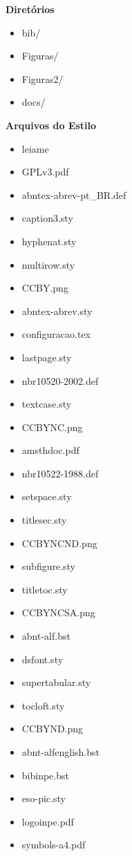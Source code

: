 \begin{multicols}{3}
    \textbf{Diretórios}
    \begin{itemize}
        \item bib/
        \item Figuras/
        \item Figuras2/
        \item docs/
    \end{itemize}
    \textbf{Arquivos do Estilo}
    \begin{itemize}
        \item leiame
        \item GPLv3.pdf
        \item abntex-abrev-pt\_BR.def
        \item caption3.sty
        \item hyphenat.sty
        \item multirow.sty
        \item CCBY.png
        \item abntex-abrev.sty
        \item configuracao.tex
        \item lastpage.sty
        \item nbr10520-2002.def
        \item textcase.sty
        \item CCBYNC.png
        \item amsthdoc.pdf
        \item nbr10522-1988.def
        \item setspace.sty
        \item titlesec.sty
        \item CCBYNCND.png
        \item subfigure.sty
        \item titletoc.sty
        \item CCBYNCSA.png
        \item abnt-alf.bst
        \item dsfont.sty
        \item supertabular.sty
        \item tocloft.sty
        \item CCBYND.png
        \item abnt-alfenglish.bst
        \item bibinpe.bst
        \item eso-pic.sty
        \item logoinpe.pdf
        \item symbols-a4.pdf

\end{itemize}
\end{multicols}
